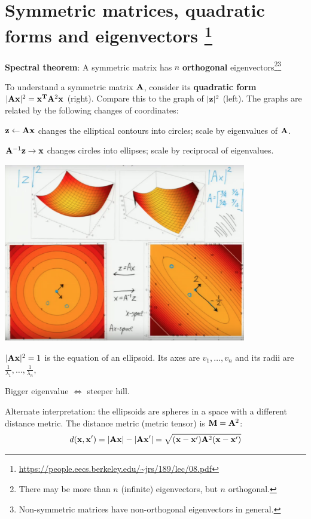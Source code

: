 \documentclass[12pt]{article}
\begin{document}
\section*{Symmetric matrices, quadratic forms and eigenvectors
  \footnote{\url{https://people.eecs.berkeley.edu/~jrs/189/lec/08.pdf}}
}

\textbf{Spectral theorem}: A symmetric matrix has $n$ \textbf{orthogonal}
eigenvectors\footnote{There may be more than $n$ (infinite) eigenvectors, but
  $n$ orthogonal.}\footnote{Non-symmetric matrices have non-orthogonal eigenvectors in
  general.}


To understand a symmetric matrix $\mathbf A$, consider its \textbf{quadratic form}
$|\mathbf A\mathbf x|^2 = \mathbf x^{\mathbf{T}} \mathbf A^2\mathbf x$ (right). Compare this to the graph of $|\mathbf z|^2$
(left). The graphs are related by the following changes of coordinates:

$\mathbf z \gets \mathbf A\mathbf x$ changes the elliptical contours into circles; scale by eigenvalues of $\mathbf A$.

$\mathbf A^{-1} \mathbf z \to \mathbf x$ changes circles into ellipses; scale by reciprocal of eigenvalues.

\includegraphics[width=300pt]{img/machine-learning-quadratic-form-eigenvectors.png}

$|\mathbf A\mathbf x|^2 = 1$ is the equation of an ellipsoid. Its axes are $v_1,\ldots,v_n$
and its radii are $\frac{1}{\lambda_1},\ldots,\frac{1}{\lambda_n},$

Bigger eigenvalue $\iff$ steeper hill.

Alternate interpretation: the ellipsoids are spheres in a space with a
different distance metric. The distance metric (metric tensor) is $\mathbf M=\mathbf A^2$:
\begin{align*}
  d(\mathbf x,\mathbf x') = |\mathbf A\mathbf x| - |\mathbf A\mathbf x'| = \sqrt{(\mathbf x - \mathbf x')\mathbf A^2(\mathbf x - \mathbf x')}
\end{align*}
\end{document}
